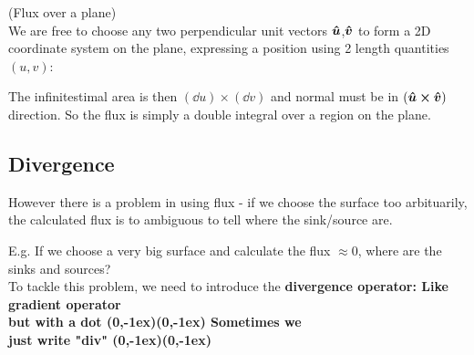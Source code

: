 \documentclass[class=article, crop=false, 12pt]{standalone}
\begin{document}
\begin{example}
    (Flux over a plane)\\
    We are free to choose any two perpendicular unit vectors $\vu*{u}$,$\vu*{v}$ 
    to form a 2D coordinate system on the plane, 
    expressing a position using 2 length quantities $(u,v)$:


    The infinitestimal area is then $(\dd{u})\times(\dd{v})$
    and normal must be in $(\vu*{u}\cross\vu*{v})$ direction.
    So the flux is simply a double integral over a region on the plane.


\end{example}


\subsection{Divergence}

However there is a problem in using flux - 
if we choose the surface too arbituarily, 
the calculated flux is to ambiguous to tell where the sink/source are.


E.g. If we choose a very big surface and calculate the flux $\approx 0$, 
where are the sinks and sources?\\

To tackle this problem,
we need to introduce the \bf{divergence} operator:
{\scriptsize Like gradient operator\\[-1ex]\scriptsize but with a dot}
{(0,-1ex)}{(0,-1ex)}
{\scriptsize Sometimes we\\[-1ex]\scriptsize just write "div"}
{(0,-1ex)}{(0,-1ex)}
\end{document}
